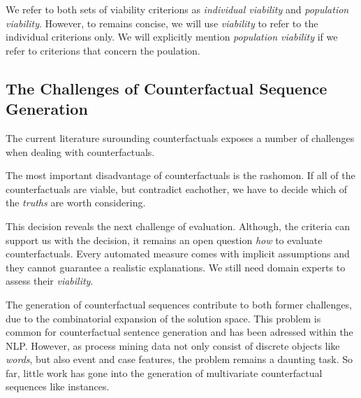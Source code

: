\documentclass[./../../paper.tex]{subfiles}
\begin{document}
We refer to both sets of viability criterions as \emph{individual viability} and \emph{population viability}. However, to remains concise, we will use \emph{viability} to refer to the individual criterions only. We will explicitly mention \emph{population viability} if we refer to criterions that concern the poulation.



\subsection{The Challenges of Counterfactual Sequence Generation}
The current literature surounding counterfactuals exposes a number of challenges when dealing with counterfactuals.

The most important disadvantage of counterfactuals is the \gls{rashomon}\autocite[ch.9.3]{molnar2019}. If all of the counterfactuals are viable, but contradict eachother, we have to decide which of the \emph{truths} are worth considering.

This decision reveals the next challenge of evaluation. Although, the criteria can support us with the decision, it remains an open question \emph{how} to evaluate counterfactuals. Every automated measure comes with implicit assumptions and they cannot guarantee a realistic explanations. We still need domain experts to assess their \emph{viability}.

The generation of counterfactual sequences contribute to both former challenges, due to the combinatorial expansion of the solution space. This problem is common for counterfactual sentence generation and has been adressed within the \gls{NLP}. However, as process mining data not only consist of discrete objects like \emph{words}, but also event and case features, the problem remains a daunting task. So far, little work has gone into the generation of multivariate counterfactual sequences like \glspl{instance}.


\end{document}
